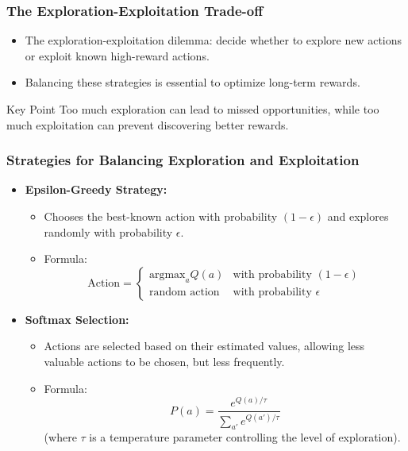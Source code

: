 \documentclass[aspectratio=169]{beamer}
\begin{document}
\begin{frame}[fragile]
    \frametitle{The Exploration-Exploitation Trade-off}
    \begin{itemize}
        \item The exploration-exploitation dilemma: decide whether to explore new actions or exploit known high-reward actions.
        \item Balancing these strategies is essential to optimize long-term rewards.
    \end{itemize}
    \begin{block}{Key Point}
        Too much exploration can lead to missed opportunities, while too much exploitation can prevent discovering better rewards.
    \end{block}
\end{frame}

\begin{frame}[fragile]
    \frametitle{Strategies for Balancing Exploration and Exploitation}
    \begin{itemize}
        \item \textbf{Epsilon-Greedy Strategy:}
            \begin{itemize}
                \item Chooses the best-known action with probability $(1 - \epsilon)$ and explores randomly with probability $\epsilon$.
                \item Formula: 
                \[
                \text{Action} = 
                \begin{cases} 
                \text{argmax}_a Q(a) & \text{with probability } (1 - \epsilon) \\
                \text{random action} & \text{with probability } \epsilon 
                \end{cases}
                \]
            \end{itemize}

        \item \textbf{Softmax Selection:}
            \begin{itemize}
                \item Actions are selected based on their estimated values, allowing less valuable actions to be chosen, but less frequently.
                \item Formula:
                \[
                P(a) = \frac{e^{Q(a)/\tau}}{\sum_{a'} e^{Q(a')/\tau}}
                \]
                (where $\tau$ is a temperature parameter controlling the level of exploration).
            \end{itemize}
    \end{itemize}
\end{frame}
\end{document}
